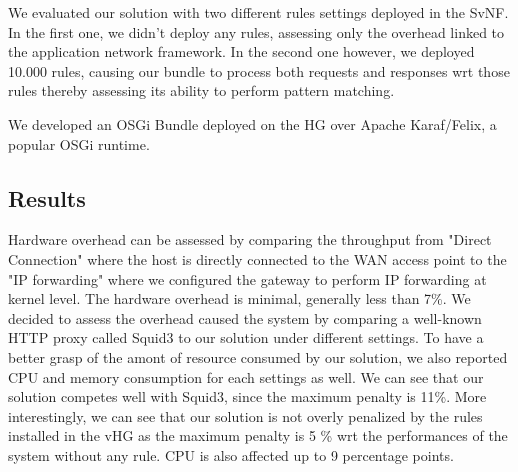 We evaluated our solution with two different rules settings deployed in the SvNF. In the first one, we didn't deploy any rules, assessing only the overhead linked to the application network framework. In the second one however, we deployed 10.000 rules, causing our bundle to process both requests and responses wrt those rules thereby assessing its ability to perform pattern matching.

We developed an OSGi Bundle deployed on the HG over Apache Karaf/Felix, a popular OSGi runtime.

\subsection{Results}

Hardware overhead can be assessed by comparing the throughput from "Direct Connection" where the host is directly connected to the WAN access point to the "IP forwarding" where we configured the gateway to perform IP forwarding at kernel level. The hardware overhead is minimal, generally less than 7\%.
We decided to assess the overhead caused the system by comparing a well-known HTTP proxy called Squid3 to our solution under different settings. To have a better grasp of the amont of resource consumed by our solution, we also reported CPU and memory consumption for each settings as well.
We can see that our solution competes well with Squid3, since the maximum penalty is 11\%. More interestingly, we can see that our solution is not overly penalized by the rules installed in the vHG as the maximum penalty is 5 \% wrt the performances of the system without any rule. CPU is also affected up to 9 percentage points.





